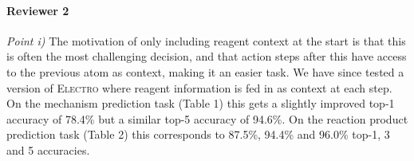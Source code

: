 \documentclass{article}
\newcommand{\ourModel}{\textsc{Electro}\xspace}
\begin{document}
% 




\paragraph{Reviewer 2}
\emph{Point i)}
The motivation of only including reagent context at the start is that this is often the most challenging decision, and that action steps after this have access to the previous atom as context, making it an easier task.
We have since tested a version of \ourModel where reagent information is fed in as context at each step. 
On the mechanism prediction task (Table 1) this gets a slightly improved top-1 accuracy of 78.4\% but a similar top-5 accuracy of 94.6\%.
 On the reaction product prediction task (Table 2) this corresponds to 87.5\%, 94.4\% and 96.0\% top-1, 3 and 5 accuracies.
\end{document}

